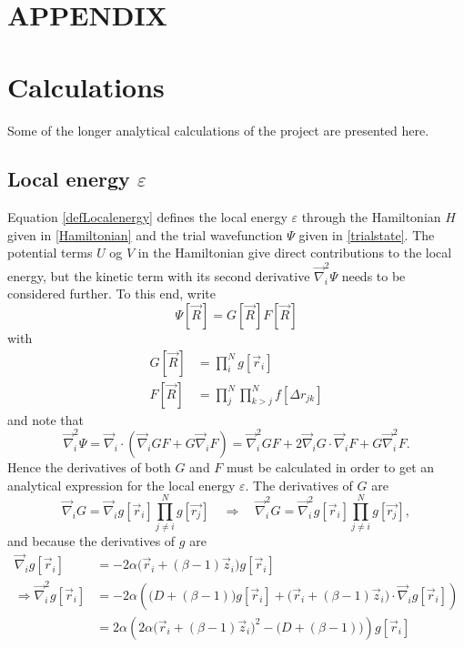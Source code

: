 \documentclass[a4paper,8pt]{article}
\begin{document}
\newpage
\appendix
\setcounter{equation}{0}
\renewcommand{\theequation}{\thesection\arabic{equation}}
\section*{APPENDIX}
\section{Calculations}

Some of the longer analytical calculations of the project are presented here.

\subsection{Local energy $\varepsilon$} \label{localenergy}
Equation \eqref{defLocalenergy} defines the local energy $\varepsilon$ through the Hamiltonian $H$ given in \eqref{Hamiltonian} and the trial wavefunction $\Psi$ given in \eqref{trialstate}. The potential terms $U$ og $V$ in the Hamiltonian give direct contributions to the local energy, but the kinetic term with its second derivative $\vec{\nabla}_i^2\Psi$ needs to be considered further. To this end, write
\begin{equation}
\Psi[\vec{R}] = G[\vec{R}]F[\vec{R}]
\end{equation}
with
\begin{align}
G[\vec{R}] &= \prod\limits_i^N g[\vec{r}_i] \\
F[\vec{R}] &= \prod\limits_j^N\prod\limits_{k > j}^N f[\Delta{r}_{jk}] 
\end{align}
and note that
\begin{equation}
\vec{\nabla}_i^2\Psi = \vec{\nabla}_i\cdot\left(\vec{\nabla}_i G F + G \vec{\nabla}_i F\right) = \vec{\nabla}_i^2 G F + 2\vec{\nabla}_i G \cdot \vec{\nabla}_i F + G \vec{\nabla}_i^2 F. \label{Lap_Psi_1} 
\end{equation}
Hence the derivatives of both $G$ and $F$ must be calculated in order to get an analytical expression for the local energy $\varepsilon$. The derivatives of $G$ are 
\begin{equation}
\vec{\nabla}_i G = \vec{\nabla}_i g[\vec{r}_i] \prod\limits_{j \neq i}^N g[\vec{r_j}] \quad\Longrightarrow\quad \vec{\nabla}_i^2 G = \vec{\nabla}_i^2 g[\vec{r}_i] \prod\limits_{j \neq i}^N g[\vec{r_j}],
\end{equation}
and because the derivatives of $g$ are
\begin{align}
\vec{\nabla}_i g[\vec{r}_i] &= -2\alpha\Big(\vec{r}_i+(\beta-1)\vec{z}_i\Big)g[\vec{r}_i] \\
\Longrightarrow \vec{\nabla}_i^2 g[\vec{r}_i] &= -2\alpha\left(\Big(D+(\beta-1)\Big)g[\vec{r}_i]+\Big(\vec{r}_i+(\beta-1)\vec{z}_i\Big)\cdot\vec{\nabla}_i g[\vec{r}_i]\right) \nonumber\\
&= 2\alpha\left(2\alpha\Big(\vec{r}_i+(\beta-1)\vec{z}_i\Big)^2-\Big(D+(\beta-1)\Big)\right)g[\vec{r}_i]
\end{align}
\end{document}
